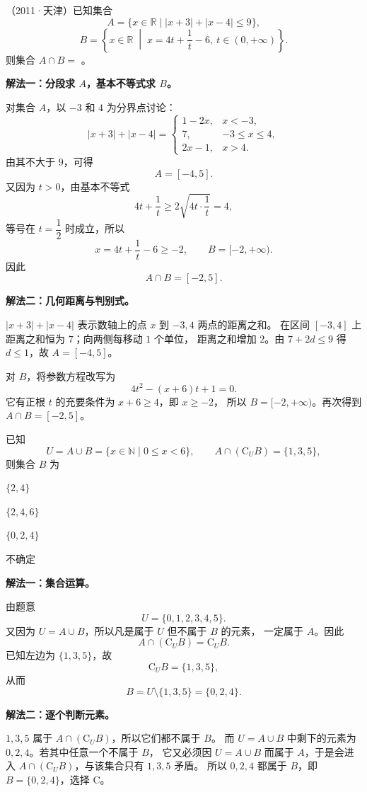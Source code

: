 \documentclass[zihao=-4]{exam-zh}
\begin{document}
\begin{question}[points=5]
（2011·天津）已知集合
\[
 A=\{x\in\mathbb R\mid |x+3|+|x-4|\le9\},
\]
\[
 B=\left\{x\in\mathbb R\;\middle|\;
 x=4t+\frac1t-6,\ t\in(0,+\infty)\right\}.
\]
则集合 $A\cap B=$ \fillin[{$[-2,5]$}]。
\begin{solution}
\textbf{解法一：分段求 $A$，基本不等式求 $B$。}

对集合 $A$，以 $-3$ 和 $4$ 为分界点讨论：
\[
 |x+3|+|x-4|=
 \begin{cases}
  1-2x,&x<-3,\\
  7,&-3\le x\le4,\\
  2x-1,&x>4.
 \end{cases}
\]
由其不大于 $9$，可得
\[
 A=[-4,5].
\]
又因为 $t>0$，由基本不等式
\[
 4t+\frac1t\ge2\sqrt{4t\cdot\frac1t}=4,
\]
等号在 $t=\dfrac12$ 时成立，所以
\[
 x=4t+\frac1t-6\ge-2,\qquad B=[-2,+\infty).
\]
因此
\[
 \boxed{A\cap B=[-2,5]}.
\]

\medskip
\textbf{解法二：几何距离与判别式。}

$|x+3|+|x-4|$ 表示数轴上的点 $x$ 到 $-3,4$ 两点的距离之和。
在区间 $[-3,4]$ 上距离之和恒为 $7$；向两侧每移动 $1$ 个单位，
距离之和增加 $2$。由 $7+2d\le9$ 得 $d\le1$，故 $A=[-4,5]$。

对 $B$，将参数方程改写为
\[
 4t^2-(x+6)t+1=0.
\]
它有正根 $t$ 的充要条件为 $x+6\ge4$，即 $x\ge-2$，
所以 $B=[-2,+\infty)$。再次得到 $A\cap B=[-2,5]$。
\end{solution}
\end{question}

\begin{question}[points=5]
已知
\[
 U=A\cup B=\{x\in\mathbb N\mid 0\le x<6\},
 \qquad A\cap(\mathrm C_U B)=\{1,3,5\},
\]
则集合 $B$ 为 \paren[C]
\begin{choices}
  \item $\{2,4\}$
  \item $\{2,4,6\}$
  \item $\{0,2,4\}$
  \item 不确定
\end{choices}
\begin{solution}
\textbf{解法一：集合运算。}

由题意
\[
 U=\{0,1,2,3,4,5\}.
\]
又因为 $U=A\cup B$，所以凡是属于 $U$ 但不属于 $B$ 的元素，
一定属于 $A$。因此
\[
 A\cap(\mathrm C_U B)=\mathrm C_U B.
\]
已知左边为 $\{1,3,5\}$，故
\[
 \mathrm C_U B=\{1,3,5\},
\]
从而
\[
 B=U\setminus\{1,3,5\}=\boxed{\{0,2,4\}}.
\]

\medskip
\textbf{解法二：逐个判断元素。}

$1,3,5$ 属于 $A\cap(\mathrm C_U B)$，所以它们都不属于 $B$。
而 $U=A\cup B$ 中剩下的元素为 $0,2,4$。若其中任意一个不属于 $B$，
它又必须因 $U=A\cup B$ 而属于 $A$，于是会进入
$A\cap(\mathrm C_U B)$，与该集合只有 $1,3,5$ 矛盾。
所以 $0,2,4$ 都属于 $B$，即 $B=\{0,2,4\}$，选择 C。
\end{solution}
\end{question}
\end{document}
